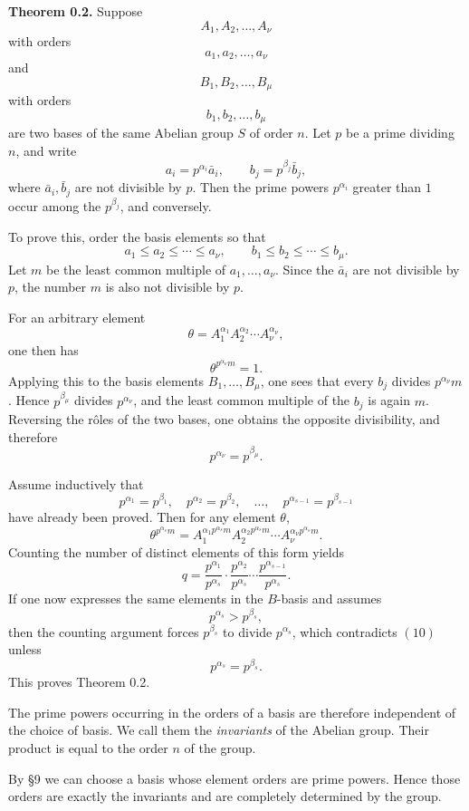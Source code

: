 \documentclass[11pt]{article}
\begin{document}
\medskip
\noindent\textbf{Theorem 0.2.}
Suppose
\[
A_1,A_2,\dots,A_\nu
\]
with orders
\[
a_1,a_2,\dots,a_\nu
\]
and
\[
B_1,B_2,\dots,B_\mu
\]
with orders
\[
b_1,b_2,\dots,b_\mu
\]
are two bases of the same Abelian group \(S\) of order \(n\). Let \(p\) be a prime dividing \(n\), and write
\[
a_i=p^{\alpha_i}\bar a_i,\qquad b_j=p^{\beta_j}\bar b_j,
\]
where \(\bar a_i,\bar b_j\) are not divisible by \(p\). Then the prime powers \(p^{\alpha_i}\) greater than \(1\) occur among the \(p^{\beta_j}\), and conversely.

\medskip
To prove this, order the basis elements so that
\[
a_1\leq a_2\leq \cdots\leq a_\nu,\qquad
b_1\leq b_2\leq \cdots\leq b_\mu.
\tag{3}
\]
Let \(m\) be the least common multiple of \(a_1,\dots,a_\nu\). Since the \(\bar a_i\) are not divisible by \(p\), the number \(m\) is also not divisible by \(p\).

For an arbitrary element
\[
\theta=A_1^{\alpha_1}A_2^{\alpha_2}\cdots A_\nu^{\alpha_\nu},
\tag{4}
\]
one then has
\[
\theta^{p^{\alpha_\nu}m}=1.
\]
Applying this to the basis elements \(B_1,\dots,B_\mu\), one sees that every \(b_j\) divides \(p^{\alpha_\nu}m\). Hence \(p^{\beta_\mu}\) divides \(p^{\alpha_\nu}\), and the least common multiple of the \(b_j\) is again \(m\). Reversing the rôles of the two bases, one obtains the opposite divisibility, and therefore
\[
p^{\alpha_\nu}=p^{\beta_\mu}.
\tag{5}
\]

Assume inductively that
\[
p^{\alpha_1}=p^{\beta_1},\quad
p^{\alpha_2}=p^{\beta_2},\quad
\dots,\quad
p^{\alpha_{s-1}}=p^{\beta_{s-1}}
\tag{6}
\]
have already been proved. Then for any element \(\theta\),
\[
\theta^{p^{\alpha_s}m}
=
A_1^{\alpha_1p^{\alpha_s}m}
A_2^{\alpha_2p^{\alpha_s}m}
\cdots
A_\nu^{\alpha_\nu p^{\alpha_s}m}.
\tag{7}
\]
Counting the number of distinct elements of this form yields
\[
q=
\frac{p^{\alpha_1}}{p^{\alpha_s}}
\cdot
\frac{p^{\alpha_2}}{p^{\alpha_s}}
\cdots
\frac{p^{\alpha_{s-1}}}{p^{\alpha_s}}.
\tag{9}
\]
If one now expresses the same elements in the \(B\)-basis and assumes
\[
p^{\alpha_s}>p^{\beta_s},
\tag{10}
\]
then the counting argument forces \(p^{\beta_s}\) to divide \(p^{\alpha_s}\), which contradicts \((10)\) unless
\[
p^{\alpha_s}=p^{\beta_s}.
\tag{14}
\]
This proves Theorem 0.2.

The prime powers occurring in the orders of a basis are therefore independent of the choice of basis. We call them the \emph{invariants} of the Abelian group. Their product is equal to the order \(n\) of the group.

By \S 9 we can choose a basis whose element orders are prime powers. Hence those orders are exactly the invariants and are completely determined by the group.
\end{document}
